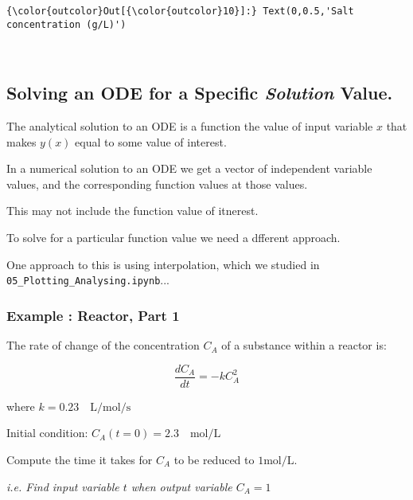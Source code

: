 \documentclass[11pt]{article}
\begin{document}
\begin{Verbatim}[commandchars=\\\{\}]
{\color{outcolor}Out[{\color{outcolor}10}]:} Text(0,0.5,'Salt concentration (g/L)')
\end{Verbatim}
            
    \begin{center}
    \end{center}
    { \hspace*{\fill} \\}
    
    \subsection{\texorpdfstring{Solving an ODE for a Specific
\emph{Solution}
Value.}{Solving an ODE for a Specific Solution Value.}}\label{solving-an-ode-for-a-specific-solution-value.}

 The analytical solution to an ODE is a function the value of input
variable \(x\) that makes \(y(x)\) equal to some value of interest.

    In a numerical solution to an ODE we get a vector of independent
variable values, and the corresponding function values at those values.

This may not include the function value of itnerest.

To solve for a particular function value we need a dfferent approach.

    One approach to this is using interpolation, which we studied in
\texttt{05\_Plotting\_Analysing.ipynb}...

    \subsubsection{Example : Reactor, Part 1}\label{example-reactor-part-1}

 The rate of change of the concentration \(C_A\) of a substance within a
reactor is:

\[\frac{dC_A}{dt}=-kC_A^2 \]

where \(k = 0.23 \quad \textrm{L/mol/s}\)

Initial condition: \(C_A(t=0) = 2.3 \quad \textrm{mol/L}\)

Compute the time it takes for \(C_A\) to be reduced to
\(1 \textrm{mol/L}\).

\emph{i.e. Find input variable \(t\) when output variable \(C_A = 1\)}
\end{document}
